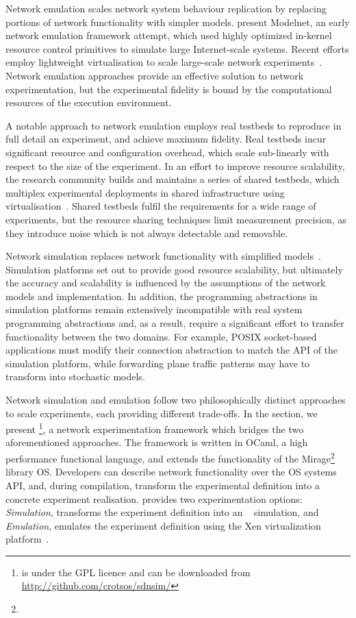 Network emulation scales network system behaviour replication by replacing
portions of network functionality with simpler models.  
present Modelnet, an early network emulation framework attempt, which used
highly optimized in-kernel resource control primitives to simulate large
Internet-scale systems. Recent efforts employ lightweight virtualisation to
scale large-scale network experiments~.
Network emulation approaches provide an effective solution to network
experimentation, but the experimental fidelity is bound by the computational
resources of the execution environment.

A notable approach to network emulation employs real testbeds to reproduce in
full detail an experiment, and achieve maximum fidelity. Real testbeds incur
significant resource and configuration overhead, which scale sub-linearly with
respect to the size of the experiment. In an effort to improve resource
scalability, the research community builds and maintains a series of shared
testbeds, which multiplex experimental deployments in shared infrastructure
using virtualisation~.  Shared testbeds fulfil the
requirements for a wide range of experiments, but the resource sharing
techniques limit measurement precision, as they introduce noise which is not
always detectable and removable. 

Network simulation replaces network functionality with simplified
models~.  Simulation platforms set out to
provide good resource scalability, but ultimately the accuracy and scalability
is influenced by the assumptions of the network models and implementation.  In
addition, the programming abstractions in simulation platforms remain
extensively incompatible with real system programming abstractions and, as a
result, require a significant effort to transfer functionality between the two
domains.  For example, POSIX socket-based applications must modify their
connection abstraction to match the API of the simulation platform, while
forwarding plane traffic patterns may have to transform into stochastic models. 

Network simulation and emulation follow two philosophically distinct approaches
to scale experiments, each providing different trade-offs.   In the section, we
present \sdnsim\footnote{\sdnsim is under the GPL licence and can be downloaded
  from \url{http://github.com/crotsos/sdnsim/}}, a network experimentation
framework which bridges the two aforementioned approaches. The framework is
written in OCaml, a high performance functional language, and extends the
functionality of the Mirage\footnote{\mirageurl} library OS\@.  Developers can
describe network functionality over the \mirage OS systems API, and, during
compilation, transform the experimental definition into a concrete experiment
realisation. \sdnsim provides two experimentation options: \emph{Simulation},
transforms the experiment definition into an ~
simulation, and \emph{Emulation}, emulates the experiment definition using 
the Xen virtualization platform~.


